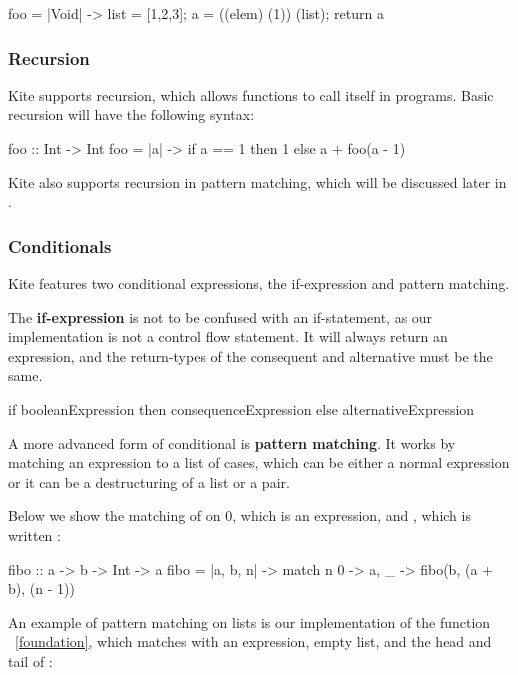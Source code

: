 \begin{kite}
  foo = |Void| -> {
    list = [1,2,3];
    a = ((elem) (1)) (list);
    return a
  }
\end{kite}

\subsubsection{Recursion}
Kite supports recursion, which allows functions to call itself in
programs. Basic recursion will have the following syntax:
\begin{kite}
  foo :: Int -> Int
  foo = |a| -> {
    if a == 1 then 1
    else a + foo(a - 1)
  }
\end{kite}
Kite also supports recursion in pattern matching, which will be
discussed later in .

\subsubsection{Conditionals}
\label{subsubsec:conditionals}
Kite features two conditional expressions, the if-expression and pattern matching.

The \textbf{if-expression} is not to be confused with an if-statement, as our implementation is not a control flow statement. It will always return an expression, and the return-types of the consequent and alternative must be the same.

\begin{kite}
if booleanExpression then consequenceExpression else alternativeExpression
\end{kite}

A more advanced form of conditional is \textbf{pattern matching}. It works by matching an expression to a list of cases, which can be either a normal expression or it can be a destructuring of a list or a pair.

Below we show the matching of  on 0, which is an expression,
and , which is written :

\begin{kite}
fibo :: a -> b -> Int -> a
fibo = |a, b, n| -> {
    match n {
    0 -> a,
    _ -> fibo(b, (a + b), (n - 1))
    }
}
\end{kite}

An example of pattern matching on lists is our implementation of the function ~\ref{foundation}, which matches  with an expression, empty list, and the head and tail of :

